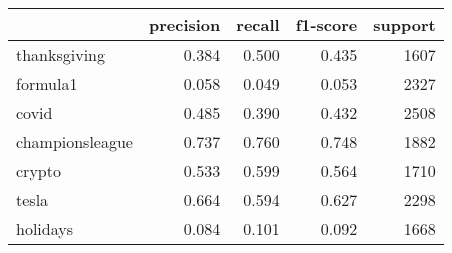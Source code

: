 \begin{tabular}{lrrrr}
\toprule
{} &  precision &  recall &  f1-score &  support \\
\midrule
thanksgiving    &      0.384 &   0.500 &     0.435 &     1607 \\
formula1        &      0.058 &   0.049 &     0.053 &     2327 \\
covid           &      0.485 &   0.390 &     0.432 &     2508 \\
championsleague &      0.737 &   0.760 &     0.748 &     1882 \\
crypto          &      0.533 &   0.599 &     0.564 &     1710 \\
tesla           &      0.664 &   0.594 &     0.627 &     2298 \\
holidays        &      0.084 &   0.101 &     0.092 &     1668 \\
\bottomrule
\end{tabular}
